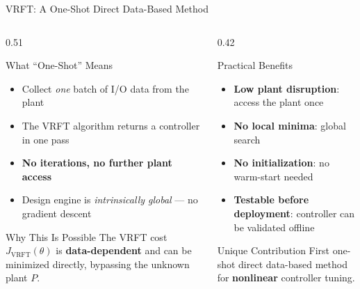 \documentclass[hyperref={pdfpagemode=FullScreen},aspectratio=169]{beamer}
\newcommand{\highlight}[1]{{\color{accentgreen!70!black}\textbf{#1}}}
\newcommand{\alerttext}[1]{{\color{alertred}\textbf{#1}}}
\newcommand{\JJ}{J_{\mathrm{VRFT}}}
\begin{document}
\begin{frame}{VRFT: A One-Shot Direct Data-Based Method}
  \begin{columns}[T]
    \begin{column}{0.51\textwidth}
      \begin{block}{What ``One-Shot'' Means}
        \begin{itemize}
          \item Collect \emph{one} batch of I/O data from the plant
          \item The VRFT algorithm returns a controller in one pass
          \item \highlight{No iterations, no further plant access}
          \item Design engine is \emph{intrinsically global} --- no gradient descent
        \end{itemize}
      \end{block}
      \vspace{0.4em}
      \begin{block}{Why This Is Possible}
        The VRFT cost $\JJ(\theta)$ is \highlight{data-dependent} and can be minimized directly, bypassing the unknown plant $P$.
      \end{block}
    \end{column}
    \begin{column}{0.42\textwidth}
      \begin{exampleblock}{Practical Benefits}
        \begin{itemize}
          \item \textbf{Low plant disruption}: access the plant once
          \item \textbf{No local minima}: global search
          \item \textbf{No initialization}: no warm-start needed
          \item \textbf{Testable before deployment}: controller can be validated offline
        \end{itemize}
      \end{exampleblock}
      \vspace{0.4em}
      \begin{alertblock}{Unique Contribution}
        \centering
        First one-shot direct data-based method for \alerttext{nonlinear} controller tuning.
      \end{alertblock}
    \end{column}
  \end{columns}
\end{frame}
\end{document}
